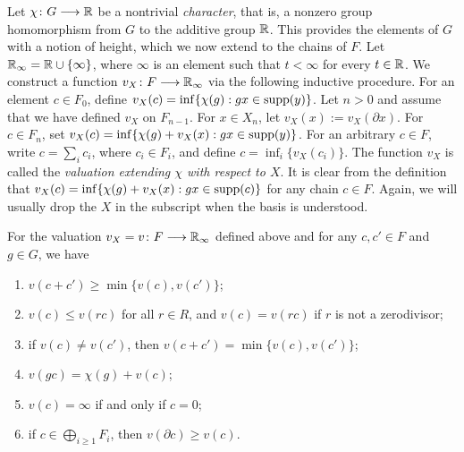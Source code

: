 \documentclass[11pt, letterpaper]{amsart}
\begin{document}
Let $\chi \colon G \longrightarrow \mathbb{R}$ be a nontrivial \textit{character}, that is, a nonzero group homomorphism from $G$ to the additive group $\mathbb{R}$. This provides the elements of $G$ with a notion of height, which we now extend to the chains of $F$. Let $\mathbb{R}_\infty = \mathbb{R} \cup \{\infty\}$, where $\infty$ is an element such that $t < \infty$ for every $t \in \mathbb{R}$.  We construct a function $v_X \colon F \longrightarrow \mathbb{R}_{\infty}$ via the following inductive procedure. For an element $c \in F_0$, define $v_X(c) = \inf\{ \chi(g) : gx \in \operatorname{supp}(y) \}$. Let $n > 0$ and assume that we have defined $v_X$ on $F_{n-1}$. For $x \in X_n$, let $v_X(x) := v_X(\partial x)$. For $c \in F_n$, set $v_X(c) = \inf\{ \chi(g) + v_X(x) : gx \in \operatorname{supp}(y) \}$. For an arbitrary $c \in F$, write $c = \sum_i c_i$, where $c_i \in F_i$, and define $c = \inf_i\{ v_X(c_i) \}$. The function $v_X$ is called the \textit{valuation extending $\chi$ with respect to $X$}. It is clear from the definition that $v_X(c) = \inf\{ \chi(g) + v_X(x) : gx \in \operatorname{supp}(c) \}$ for any chain $c \in F$. Again, we will usually drop the $X$ in the subscript when the basis is understood.


\begin{prop} \label{PropPropsOfVal}
For the valuation $v_X = v \colon F \longrightarrow \mathbb{R}_\infty$ defined above and for any $c, c' \in F$ and $g \in G$, we have
\begin{enumerate}[label=(\arabic*)]
    \item\label{item:sum} $v(c + c') \geqslant \min\{ v(c), v(c') \}$;
    \item\label{item:scalar} $v(c) \leqslant v(rc)$ for all $r \in R$, and $v(c) = v(rc)$ if $r$ is not a zerodivisor;
    \item\label{item:sumequal} if $v(c) \neq v(c')$, then $v(c + c') = \min\{ v(c), v(c') \}$;
    \item\label{item:groupelement} $v(g c) = \chi(g) + v(c)$;
    \item\label{item:infheight} $v(c) = \infty$ if and only if $c = 0$;
    \item\label{item:bdyincrease} if $c \in \bigoplus_{i \geqslant 1} F_i$, then  $v(\partial c) \geqslant v(c)$.
\end{enumerate}
\end{prop}
\end{document}
